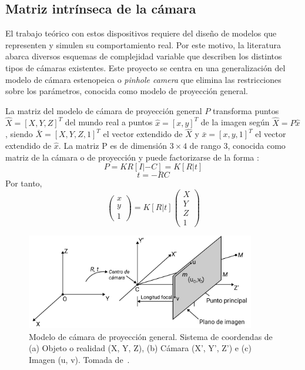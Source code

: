 \subsection{Matriz intrínseca de la cámara}\label{section:calibration}

El trabajo teórico con estos dispositivos requiere del diseño de modelos que representen y simulen su comportamiento real. Por este motivo, la literatura abarca diversos esquemas de complejidad variable que describen los distintos tipos de cámaras existentes. Este proyecto se centra en una generalización del modelo de cámara estenopeica o \textit{pinhole camera} que elimina las restricciones sobre los parámetros, conocida como modelo de proyección general.

\begin{definition}
	La matriz del modelo de cámara de proyección general $P$ transforma puntos $\hat{X} = [X, Y, Z]^T$ del mundo real a puntos $\hat{x} = [x, y]^T$ de la imagen según $\hat{X} = P\hat{x}$, siendo $\bar{X} = [X, Y, Z, 1]^T$ el vector extendido de $\hat{X}$ y $\bar{x} = [x, y, 1]^T$ el vector extendido de $\hat{x}$. La matriz P es de dimensión $3 \times 4$ de rango 3, conocida como matriz de la cámara o de proyección y puede factorizarse de la forma \cite{hartley2004camera}:
	\begin{equation}\label{eq:proyGeneral-1}
		P = KR[I| - C] = K[R|t]
	\end{equation}
	\begin{equation}\label{eq:proyGeneral-2}
		t = -RC
	\end{equation}
	Por tanto,
	\begin{equation}\label{eq:proyGeneral-3}
		\begin{pmatrix}
			x\\
			y\\
			1
		\end{pmatrix} = K[R|t] \begin{pmatrix}
			X\\
			Y\\
			Z\\
			1	
		\end{pmatrix}
	\end{equation}
\end{definition}

\begin{figure}[ht]
	\centering
	\includegraphics[width=10cm]{./Graphics/modelo-proyeccion-general.png}
	\caption{Modelo de cámara de proyección general. Sistema de coordendas de (a) Objeto o realidad (X, Y, Z), (b) Cámara (X', Y', Z') e (c) Imagen (u, v). Tomada de~\cite{ji2022vision}.}
	\label{fig:proyGeneral}
\end{figure}

